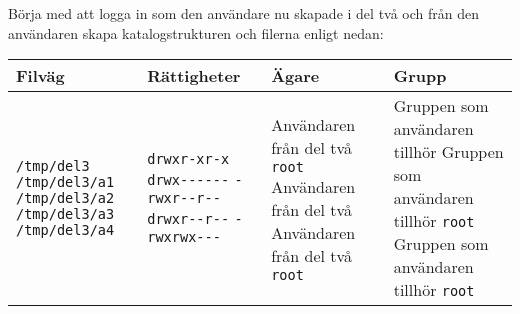 Börja med att logga in som den användare nu skapade i del två och från
den användaren skapa katalogstrukturen och filerna enligt nedan:

\begin{longtable}[c]{@{}llll@{}}
\toprule
\begin{minipage}[b]{0.16\columnwidth}\raggedright\strut
\textbf{Filväg}
\strut\end{minipage} &
\begin{minipage}[b]{0.17\columnwidth}\raggedright\strut
\textbf{Rättigheter}
\strut\end{minipage} &
\begin{minipage}[b]{0.24\columnwidth}\raggedright\strut
\textbf{Ägare}
\strut\end{minipage} &
\begin{minipage}[b]{0.31\columnwidth}\raggedright\strut
\textbf{Grupp}
\strut\end{minipage}\tabularnewline
\midrule
\endhead
\begin{minipage}[t]{0.16\columnwidth}\raggedright\strut
\texttt{/tmp/del3} \texttt{/tmp/del3/a1} \texttt{/tmp/del3/a2}
\texttt{/tmp/del3/a3} \texttt{/tmp/del3/a4}
\strut\end{minipage} &
\begin{minipage}[t]{0.17\columnwidth}\raggedright\strut
\texttt{drwxr-xr-x} \texttt{drwx-\/-\/-\/-\/-\/-}
\texttt{-rwxr-\/-r-\/-} \texttt{drwxr-\/-r-\/-} \texttt{-rwxrwx-\/-\/-}
\strut\end{minipage} &
\begin{minipage}[t]{0.24\columnwidth}\raggedright\strut
Användaren från del två \texttt{root} Användaren från del två Användaren
från del två \texttt{root}
\strut\end{minipage} &
\begin{minipage}[t]{0.31\columnwidth}\raggedright\strut
Gruppen som användaren tillhör Gruppen som användaren tillhör
\texttt{root} Gruppen som användaren tillhör \texttt{root}
\strut\end{minipage}\tabularnewline
\bottomrule
\end{longtable}
